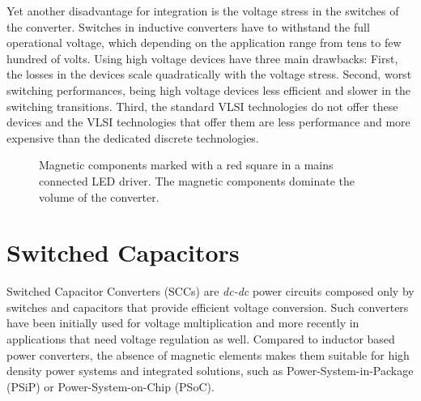 Yet another disadvantage for integration is the voltage stress in the switches of the converter. Switches in inductive converters have to withstand the full operational voltage, which depending on the application range from tens to few hundred of volts. Using high voltage devices have three main drawbacks: First, the losses in the devices scale quadratically with the voltage  stress. Second, worst switching performances, being high voltage devices less efficient and slower in the switching transitions. Third, the standard VLSI technologies do not offer these devices and the VLSI technologies that offer them are less performance and more expensive than the dedicated discrete technologies.

\begin{figure}[!h]
\centering
{}
\caption{Magnetic components marked with a red square in a mains connected LED driver. The magnetic components dominate the volume of the converter.}
\label{fig:smps_driver}
\end{figure}


\section{Switched Capacitors}
Switched Capacitor Converters (SCCs) are \emph{dc-dc} power circuits composed only by switches and capacitors that provide efficient voltage conversion. Such converters have been initially used for voltage multiplication and more recently in applications that need voltage regulation as well. Compared to inductor based power converters, the absence of magnetic elements makes them suitable for high density power systems and integrated solutions, such as Power-System-in-Package (PSiP) or Power-System-on-Chip (PSoC).

